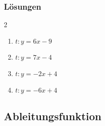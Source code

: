 \subsubsection*{Lösungen}
\begin{multicols}{2}
    \begin{enumerate}
        \item $t:y=6x-9$
        \item $t:y=7x-4$
        \item $t:y=-2x+4$
        \item $t:y=-6x+4$
    \end{enumerate}
\end{multicols}
\newpage
\subsection{Ableitungsfunktion}



